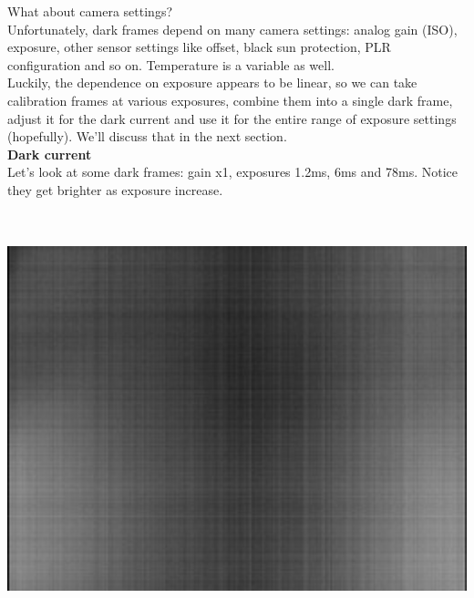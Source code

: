 What about camera settings?\\

Unfortunately, dark frames depend on many camera settings: analog gain (ISO), exposure, other sensor settings like offset, black sun protection, PLR configuration and so on. Temperature is a variable as well.\\

Luckily, the dependence on exposure appears to be linear, so we can take calibration frames at various exposures, combine them into a single dark frame, adjust it for the dark current and use it for the entire range of exposure settings (hopefully). We'll discuss that in the next section.\\ 

\textbf{Dark current}\\

Let's look at some dark frames: gain x1, exposures 1.2ms, 6ms and 78ms. Notice they get brighter as exposure increase.\\

\begin{center}
\includegraphics[height=12cm]{images/blackframes-gainx1-offset2047-1ms-01}
\end{center}

